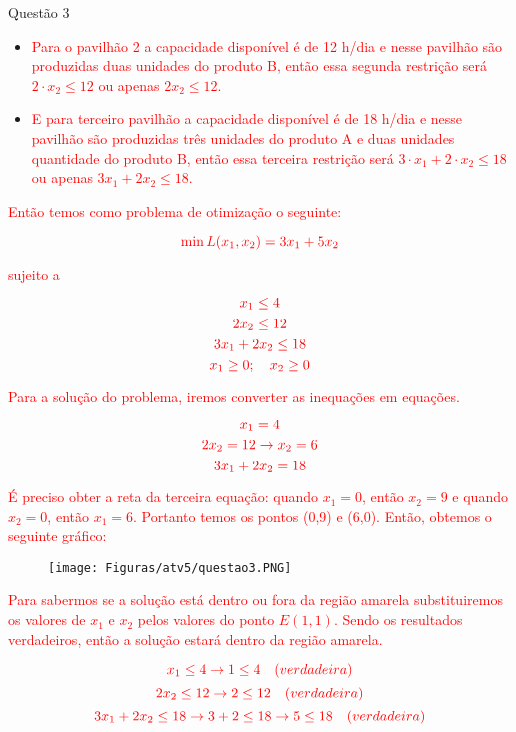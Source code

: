 \documentclass[12pt]{article}
\begin{document}
\begin{section}{Questão 3}
\begin{itemize}
     \item \textcolor{red}{Para o pavilhão 2 a capacidade disponível é de 12 h/dia e nesse pavilhão são produzidas duas unidades do produto B, então essa segunda restrição será $2 \cdot x_2 \leq 12$ ou apenas $2x_2 \leq 12$.}
     
     \item \textcolor{red}{E para terceiro pavilhão a capacidade disponível é de 18 h/dia e nesse pavilhão são produzidas três unidades do produto A e duas unidades quantidade do produto B, então essa terceira restrição será $3 \cdot x_1 + 2 \cdot x_2 \leq 18$ ou apenas $3x_1 + 2x_2 \leq 18$.}
 \end{itemize}
 
 
\noindent \textcolor{red}{Então temos como problema de otimização o seguinte:}
 
 $$
 \textcolor{red}{\min L(x_1,x_2) = 3x_1 + 5x_2}
$$

\textcolor{red}{sujeito a }

$$
\textcolor{red}{x_1 \leq 4}
$$
$$
\textcolor{red}{2x_2 \leq 12}
$$
$$
\textcolor{red}{3x_1 + 2x_2 \leq 18}
$$
$$
\textcolor{red}{x_1 \geq 0; \quad x_2 \geq 0}
$$

\noindent \textcolor{red}{Para a solução do problema, iremos converter as inequações em equações.}

$$
\textcolor{red}{x_1 = 4}
$$
$$
\textcolor{red}{2x_2 = 12 \rightarrow x_2 = 6}
$$
$$
\textcolor{red}{3x_1 + 2x_2 = 18}
$$

\noindent \textcolor{red}{É preciso obter a reta da terceira equação: quando $x_1 = 0$, então $x_2 = 9$ e quando $x_2 = 0$, então $x_1 = 6$. Portanto temos os pontos (0,9) e (6,0). Então, obtemos o seguinte gráfico:}

\begin{figure}[H]
    \centering
    \texttt{[image: Figuras/atv5/questao3.PNG]}
\end{figure}

\noindent \textcolor{red}{Para sabermos se a solução está dentro ou fora da região amarela substituiremos os valores de $x_1$ e $x_2$ pelos valores do ponto $E(1,1)$. Sendo os resultados verdadeiros, então a solução estará dentro da região amarela.}

$$
\textcolor{red}{x_1 \leq 4 \rightarrow 1 \leq 4 \quad \textrm(verdadeira)}
$$
$$
\textcolor{red}{2x_2 \leq 12 \rightarrow 2 \leq 12 \quad \textrm(verdadeira)}
$$
$$
\textcolor{red}{3x_1 + 2x_2 \leq 18 \rightarrow 3+2 \leq 18 \rightarrow 5 \leq 18 \quad \textrm(verdadeira)}
$$


\end{section}
\end{document}
